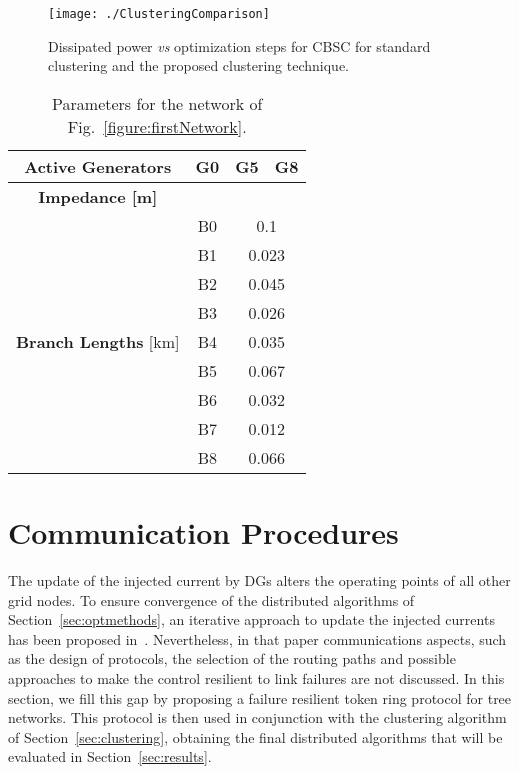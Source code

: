 \documentclass[journal]{IEEEtran}
\newcommand{\fig}[1]{Fig.~\ref{#1}}
\newcommand{\secref}[1]{Section~\ref{#1}}
\begin{document}
\begin{figure}
\centering
\texttt{[image: ./ClusteringComparison]}
\caption{Dissipated power {\it vs} optimization steps for CBSC for standard clustering and the proposed clustering technique.}\label{figure:compCluster}
\end{figure}

\begin{table}[ht]
\caption{Parameters for the network of \fig{figure:firstNetwork}.}
\centering
\begin{tabular}{|c|ccc|}
\hline
\textbf{Active Generators} & G0 & G5 & G8\\
\hline
\textbf{Impedance [m]} & \multicolumn{3}{c|}{}\\
\hline
\multirow{9}{*}{\textbf{Branch Lengths} [km]}
&B0&\multicolumn{2}{|c|}{0.1}\\
\cline{2-4}
&B1&\multicolumn{2}{|c|}{0.023}\\
\cline{2-4}
&B2&\multicolumn{2}{|c|}{0.045}\\
\cline{2-4}
&B3&\multicolumn{2}{|c|}{0.026}\\
\cline{2-4}
&B4&\multicolumn{2}{|c|}{0.035}\\
\cline{2-4}
&B5&\multicolumn{2}{|c|}{0.067}\\
\cline{2-4}
&B6&\multicolumn{2}{|c|}{0.032}\\
\cline{2-4}
&B7&\multicolumn{2}{|c|}{0.012}\\
\cline{2-4}
&B8&\multicolumn{2}{|c|}{0.066}\\
\hline
\end{tabular}
\label{table:clusterParamsTable}
\end{table}



\section{Communication Procedures}
\label{sec:commproc}

The update of the injected current by DGs alters the operating points of all other grid nodes. To ensure convergence of the distributed algorithms of \secref{sec:optmethods}, an iterative approach to update the injected currents has been proposed in~\cite{SurroundControl}. Nevertheless, in that paper communications aspects, such as the design of protocols, the selection of the routing paths and possible approaches to make the control resilient to link failures are not discussed. In this section, we fill this gap by proposing a failure resilient token ring protocol for tree networks. This protocol is then used in conjunction with the clustering algorithm of \secref{sec:clustering}, obtaining the final distributed algorithms that will be evaluated in \secref{sec:results}.
\end{document}
